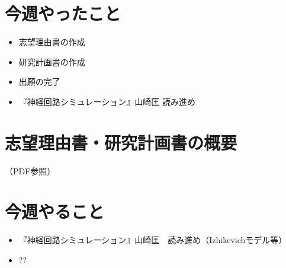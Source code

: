 \documentclass[dvipdfmx, A4j, twocolumn, 10.5pt]{jsarticle}
\begin{document}


\section{今週やったこと}
\begin{itemize}
 \item 志望理由書の作成
 \item 研究計画書の作成
 \item 出願の完了
 \item 『神経回路シミュレーション』山崎匡 読み進め

\end{itemize}
\section{志望理由書・研究計画書の概要}
（PDF参照）



\section{今週やること}
\begin{itemize}
 \item 『神経回路シミュレーション』山崎匡　読み進め（Izhikevichモデル等）
 \item ??
\end{itemize}
\end{document}
